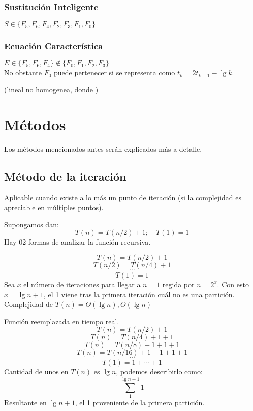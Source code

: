 \documentclass[tikz,11pt,fleqn]{book} %
\begin{document}
\subsubsection{Sustitución Inteligente}
\(  S\in\{F_5, F_6, F_4, F_2, F_3, F_1, F_0\} \)

\subsubsection{Ecuación Característica}
\(  E\in\{F_5, F_6, F_4\}\not\in\{F_0, F_1, F_2, F_3\} \)\\
No obstante $F_0$ puede pertenecer si se representa como $t_k=2t_{k-1}-\lg k$.

(lineal no homogenea, donde )

\section{Métodos}
Los métodos mencionados antes serán explicados más a detalle.

\subsection{Método de la iteración}
Aplicable cuando existe a lo más un punto de iteración (si la complejidad es apreciable en múltiples puntos).

\begin{example}
    Supongamos dan:
        $$T(n)=T(n/2)+1;\quad T(1)=1$$
    Hay 02 formas de analizar la función recursiva.
    \begin{definition}
        $$T(n)=T(n/2)+1$$
        $$T(n/2)=T(n/4)+1$$
        $$\cdots$$
        $$T(1)=1$$
        Sea $x$ el número de iteraciones para llegar a $n=1$ regida por $n=2^x$.
        Con esto $x=\lg n +1$, el 1 viene tras la primera iteración cuál no es una partición.
        Complejidad de $T(n)=\Theta(\lg n), O(\lg n)$
    \end{definition}
    \begin{definition}
        Función reemplazada en tiempo real.
        $$ T(n)=T(n/2)+1 $$
        $$ T(n)=T(n/4)+1+1 $$
        $$ T(n)=T(n/8)+1+1+1 $$
        $$ T(n)=T(n/16)+1+1+1+1 $$
        $$ \cdots $$
        $$ T(1)=1+\cdots+1 $$
        Cantidad de unos en $T(n)$ es $\lg n$, podemos describirlo como:
        $$  \sum_1^{\lg n+1} 1  $$
        Resultante en $\lg n+1$, el 1 proveniente de la primera partición.
    \end{definition}
\end{example}
\end{document}

